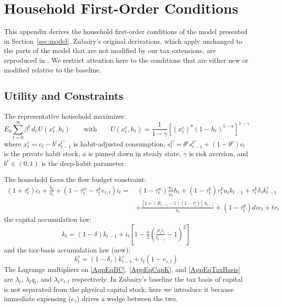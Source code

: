 \clearpage

\section{Household First-Order Conditions}
\label{AppHouseholdFOCs}

This appendix derives the household first-order conditions of the model presented in Section~\ref{sec:model}. Zubairy's original derivations, which apply unchanged to the parts of the model that are not modified by our tax extensions, are reproduced in . We restrict attention here to the conditions that are either new or modified relative to the baseline.

\subsection{Utility and Constraints}

The representative household maximizes:
\begin{equation}\label{AppEqUtility}
    E_0 \sum_{t=0}^{\infty} \beta^t\, d_t\, U(x_t^c, h_t) \qquad
    \text{with}\qquad U(x_t^c, h_t) = \frac{1}{1-\gamma}\left[(x_t^c)^a (1-h_t)^{1-a}\right]^{1-\gamma}
\end{equation}
where $x_t^c = c_t - b^c s_{t-1}^C$ is habit-adjusted consumption, $s_t^C = \theta^c s_{t-1}^C + (1-\theta^c) c_t$ is the private habit stock, $a$ is pinned down in steady state, $\gamma$ is risk aversion, and $b^c \in (0,1)$ is the deep-habit parameter.

The household faces the flow budget constraint:
\begin{equation}\label{AppEqBC}
\begin{split}
    (1+\tau_t^c)c_t + \frac{b_t}{\pi_t} + (1 - \tau_t^{ic} - \tau_t^k e_{\tau,t})i_t
    = & \; (1-\tau_t^w)\frac{w_t}{\tilde w_t}h_t + (1-\tau_t^k)r_t^k u_t k_{t-1} + \tau_t^k \delta_\tau k_{t-1}^\tau \\
    & + \frac{[1 + (R_{t-1}-1)(1-\tau_t^i)]\, b_{t-1}}{\pi_t} + (1-\tau_t^d)div_t + tr_t
\end{split}
\end{equation}
the capital accumulation law:
\begin{equation}\label{AppEqCapK}
    k_t = (1-\delta)k_{t-1} + i_t\left[1 - \tfrac{\kappa}{2}\left(\tfrac{\mu_t i_t}{i_{t-1}} - 1\right)^2\right]
\end{equation}
and the tax-basis accumulation law (new):
\begin{equation}\label{AppEqTaxBasis}
    k_t^\tau = (1 - \delta_\tau) k_{t-1}^\tau + i_t (1 - e_{\tau,t})
\end{equation}
The Lagrange multipliers on \eqref{AppEqBC}, \eqref{AppEqCapK}, and \eqref{AppEqTaxBasis} are $\lambda_t$, $\lambda_t q_t$, and $\lambda_t v_{\tau,t}$ respectively. In Zubairy's baseline the tax basis of capital is not separated from the physical capital stock; here we introduce it because immediate expensing ($e_\tau$) drives a wedge between the two.

